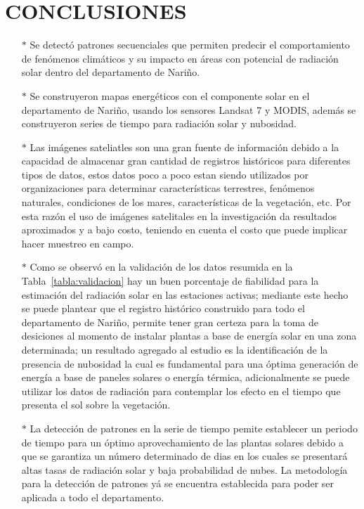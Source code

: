 \chapter{ CONCLUSIONES}
\begin{itemize}
  \item[$*$]Se detectó patrones secuenciales que permiten predecir el comportamiento de fenómenos
    climáticos y su impacto en áreas con potencial de radiación solar dentro del departamento de Nariño.

  \item[$*$]Se construyeron mapas energéticos con el componente solar en el departamento de Nariño,
  usando los sensores Landsat 7 y MODIS, además se construyeron series de tiempo para radiación solar y nubosidad.

  \item[$*$]Las imágenes sateliatles son una gran fuente de información debido a la capacidad de almacenar gran cantidad de registros históricos 
  para diferentes tipos de datos, estos datos poco a poco estan siendo utilizados por organizaciones para determinar características terrestres, 
  fenómenos naturales, condiciones de los mares, características de la vegetación, etc. Por esta razón el uso de imágenes satelitales en la investigación 
  da resultados aproximados y a bajo costo, teniendo en cuenta el costo que puede implicar hacer muestreo en campo. 

  \item[$*$]Como se observó en la validación de los datos resumida en la Tabla~\ref{tabla:validacion} hay un buen porcentaje de fiabilidad para la estimación 
  del radiación solar en las estaciones activas; mediante este hecho se puede plantear que el registro histórico construido para todo el departamento de Nariño, 
  permite tener gran certeza para la toma de desiciones al momento de instalar plantas a base de energía solar en una zona determinada; un resultado agregado al 
  estudio es la identificación de la presencia de nubosidad la cual es fundamental para una óptima generación de energía a base de paneles solares o energía 
  térmica, adicionalmente se puede utilizar los datos de radiación para contemplar los efecto en el tiempo que presenta el sol sobre la vegetación. 

  \item[$*$]La detección de patrones en la serie de tiempo pemite establecer un periodo de tiempo para un óptimo aprovechamiento de las plantas solares 
  debido a que se garantiza un número determinado de dias en los cuales se presentará altas tasas de radiación solar y baja probabilidad de nubes. La metodología 
  para la detección de patrones yá se encuentra establecida para poder ser aplicada a todo el departamento.


\end{itemize}
